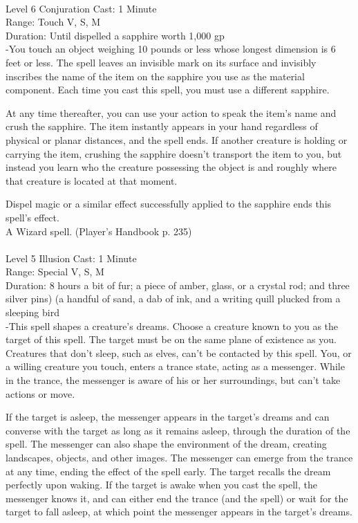 \documentclass[10pt,twocolumn]{report}
\begin{document}
 \\
Level 6 \quad Conjuration \quad Cast: 1 Minute\\
Range: Touch \quad V, S, M \\
Duration: Until dispelled \quad a sapphire worth 1,000 gp\\
-You touch an object weighing 10 pounds or less whose longest dimension is 6 feet or less. 
The spell leaves an invisible mark on its surface and invisibly inscribes the name of the item on the sapphire you use as the material component. Each time you cast this spell, you must use a different sapphire. 

At any time thereafter, you can use your action to speak the item’s name and crush the sapphire. The item instantly appears in your hand regardless of physical or planar distances, and the spell ends. If another creature is holding or carrying the item, crushing the sapphire doesn’t transport the item to you, but instead you learn who the creature possessing the object is and roughly where that creature is located at that moment. 

Dispel magic or a similar effect successfully applied to the sapphire ends this spell’s effect.\\
A Wizard spell. (Player's Handbook p. 235) \\


 \\
Level 5 \quad Illusion \quad Cast: 1 Minute\\
Range: Special \quad V, S, M \\
Duration: 8 hours \quad a bit of fur; a piece of amber, glass, or a crystal rod; and three silver pins) (a handful of sand, a dab of ink, and a writing quill plucked from a sleeping bird\\
-This spell shapes a creature’s dreams. 
Choose a creature known to you as the target of this spell. The target must be on the same plane of existence as you. Creatures that don’t sleep, such as elves, can’t be contacted by this spell. You, or a willing creature you touch, enters a trance state, acting as a messenger. While in the trance, the messenger is aware of his or her surroundings, but can’t take actions or move. 

If the target is asleep, the messenger appears in the target’s dreams and can converse with the target as long as it remains asleep, through the duration of the spell. The messenger can also shape the environment of the dream, creating landscapes, objects, and other images. The messenger can emerge from the trance at any time, ending the effect of the spell early. The target recalls the dream perfectly upon waking. If the target is awake when you cast the spell, the messenger knows it, and can either end the trance (and the spell) or wait for the target to fall asleep, at which point the messenger appears in the target’s dreams. 
\end{document}
